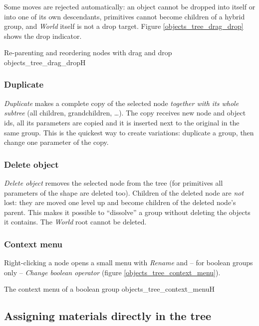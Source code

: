 Some moves are rejected automatically: an object cannot be dropped into itself or into one of its
own descendants, primitives cannot become children of a hybrid group, and \emph{World} itself is
not a drop target. Figure \ref{objects_tree_drag_drop} shows the drop indicator.

{Re-parenting and reordering nodes with drag and drop}
{objects_tree_drag_drop}{H}

\subsubsection{Duplicate}

\emph{Duplicate} makes a complete copy of the selected node \emph{together with its whole subtree}
(all children, grandchildren, \ldots). The copy receives new node and object ids, all its parameters
are copied and it is inserted next to the original in the same group. This is the quickest way to
create variations: duplicate a group, then change one parameter of the copy.

\subsubsection{Delete object}

\emph{Delete object} removes the selected node from the tree (for primitives all parameters of the
shape are deleted too). Children of the deleted node are \emph{not} lost: they are moved one level
up and become children of the deleted node's parent. This makes it possible to ``dissolve'' a group
without deleting the objects it contains. The \emph{World} root cannot be deleted.

\subsubsection{Context menu}

Right-clicking a node opens a small menu with \emph{Rename} and -- for boolean groups only --
\emph{Change boolean operator} (figure \ref{objects_tree_context_menu}).

{The context menu of a boolean group}
{objects_tree_context_menu}{H}

\subsection{Assigning materials directly in the tree}\label{objects-tree-materials}

